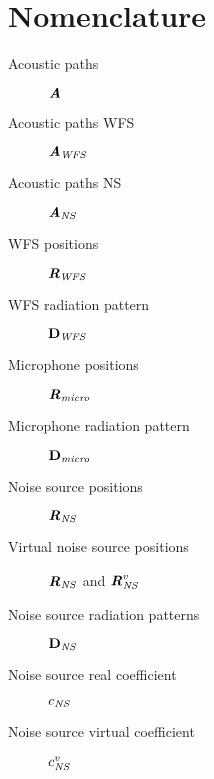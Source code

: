\chapter{Nomenclature}

\begin{description}
	\item[Acoustic paths] $\bm{\mathit{A}}$
	\item[Acoustic paths WFS] $\bm{\mathit{A}}_\mathit{WFS}$
	\item[Acoustic paths NS] $\bm{\mathit{A}}_\mathit{NS}$
	\item[WFS positions] $\Pos[mat][WFS]$
	\item[WFS radiation pattern] $\Diag[vec][WFS]$
	\item[Microphone positions] $\Pos[mat][micro]$
	\item[Microphone radiation pattern] $\Diag[vec][micro]$
	\item[Noise source positions] $\Pos[mat][NS]$
	\item[Virtual noise source positions] $\Pos[mat][NS]$ and $\Pos[mat][NS]<virtual>$
	\item[Noise source radiation patterns] $\Diag[vec][NS]$
	\item[Noise source real coefficient] $\coef[scalar][NS]$
	\item[Noise source virtual coefficient] $\coef[scalar][NS]<virtual>$
\end{description}